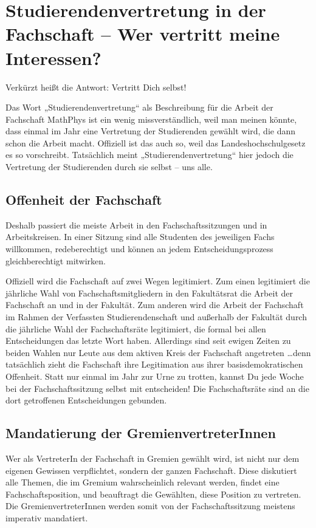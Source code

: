 \section[Studierendenvertretung in der Fachschaft]{Studierendenvertretung in der Fachschaft -- Wer vertritt meine Interessen?}

Verkürzt heißt die Antwort: Vertritt Dich selbst!

Das Wort „Studierendenvertretung“ als Beschreibung für die Arbeit der Fachschaft MathPhys ist ein wenig missverständlich, weil man meinen könnte, dass einmal im Jahr eine Vertretung der Studierenden gewählt wird, die dann schon die Arbeit macht. Offiziell ist das auch so, weil das Landeshochschulgesetz es so vorschreibt. Tatsächlich meint „Studierendenvertretung“ hier jedoch die Vertretung der Studierenden durch sie selbst -- uns alle.

\subsection*{Offenheit der Fachschaft}

Deshalb passiert die meiste Arbeit in den Fachschaftssitzungen und in Arbeitskreisen. In einer Sitzung sind alle Studenten des jeweiligen Fachs willkommen, redeberechtigt und können an jedem Entscheidungsprozess gleichberechtigt mitwirken.

Offiziell wird die Fachschaft auf zwei Wegen legitimiert. Zum einen legitimiert die jährliche Wahl von Fachschaftsmitgliedern in den Fakultätsrat die Arbeit der Fachschaft an und in der Fakultät. Zum anderen wird die Arbeit der Fachschaft im Rahmen der Verfassten Studierendenschaft und außerhalb der Fakultät durch die jährliche Wahl der Fachschaftsräte legitimiert, die formal bei allen Entscheidungen das letzte Wort haben. Allerdings sind seit ewigen Zeiten zu beiden Wahlen nur Leute aus dem aktiven Kreis der Fachschaft angetreten \dots denn tatsächlich zieht die Fachschaft ihre Legitimation aus ihrer basisdemokratischen Offenheit. Statt nur einmal im Jahr zur Urne zu trotten, kannst Du jede Woche bei der Fachschaftssitzung selbst mit entscheiden! Die Fachschaftsräte sind an die dort getroffenen Entscheidungen gebunden.

\subsection*{Mandatierung der GremienvertreterInnen}

Wer als VertreterIn der Fachschaft in Gremien gewählt wird, ist nicht nur dem eigenen Gewissen verpflichtet, sondern der ganzen Fachschaft. Diese diskutiert alle Themen, die im Gremium wahrscheinlich relevant werden, findet eine Fachschaftsposition, und beauftragt die Gewählten, diese Position zu vertreten. Die GremienvertreterInnen werden somit von der Fachschaftssitzung meistens imperativ mandatiert.

